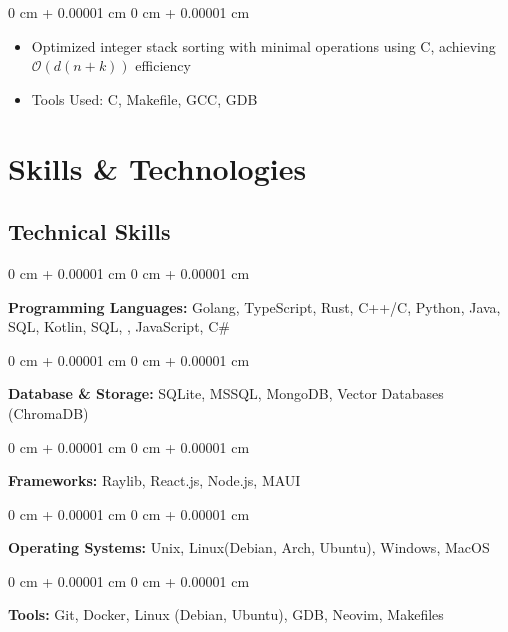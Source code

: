 \documentclass[10pt, letterpaper]{article}
\newenvironment{highlights}{
    \begin{itemize}[
        topsep=0.10 cm,
        parsep=0.10 cm,
        partopsep=0pt,
        itemsep=0pt,
        leftmargin=0 cm + 10pt
    ]
}{
    \end{itemize}
} %
\newenvironment{onecolentry}{
    \begin{adjustwidth}{
        0 cm + 0.00001 cm
    }{
        0 cm + 0.00001 cm
    }
}{
    \end{adjustwidth}
} %
\begin{document}
        \vspace{0.10 cm}
        \begin{onecolentry}
            \begin{highlights}
                \item Optimized integer stack sorting with minimal operations using C, achieving $\mathcal{O}(d(n + k))$ efficiency
                \item Tools Used: C, Makefile, GCC, GDB
            \end{highlights}
        \end{onecolentry}


    
\section{Skills \& Technologies}

\subsection*{Technical Skills}
\begin{onecolentry}
    \textbf{Programming Languages:} Golang, TypeScript, Rust, C++/C, Python, Java, SQL, Kotlin, SQL, , JavaScript, C\# 
\end{onecolentry}

\vspace{0.1 cm}

\begin{onecolentry}
    \textbf{Database \& Storage:} SQLite, MSSQL, MongoDB, Vector Databases (ChromaDB)
\end{onecolentry}

\vspace{0.1 cm}

\begin{onecolentry}
    \textbf{Frameworks:} Raylib, React.js, Node.js, MAUI
\end{onecolentry}

\vspace{0.1 cm}

\begin{onecolentry}
    \textbf{Operating Systems:} Unix, Linux(Debian, Arch, Ubuntu), Windows, MacOS
\end{onecolentry}

\vspace{0.1 cm}

\begin{onecolentry}
    \textbf{Tools:} Git, Docker, Linux (Debian, Ubuntu), GDB, Neovim, Makefiles
\end{onecolentry}
\end{document}
